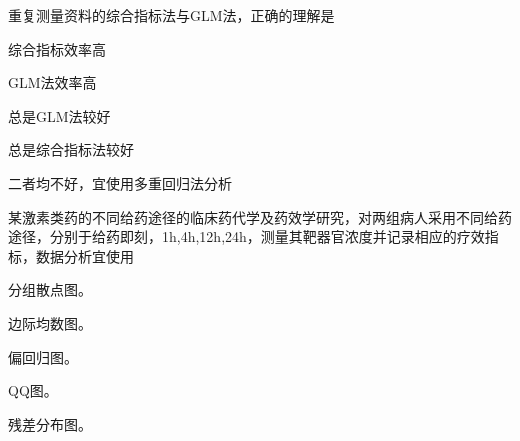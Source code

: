 \par\addvspace{6pt}\noindent\begin{minipage}{\linewidth}


重复测量资料的综合指标法与GLM法，正确的理解是


\begin{choices}

\item 综合指标效率高

\item GLM法效率高

\item 总是GLM法较好

\item 总是综合指标法较好

\item 二者均不好，宜使用多重回归法分析

\end{choices}

\end{minipage}\par\vspace{4pt}

\par\addvspace{6pt}\noindent\begin{minipage}{\linewidth}


某激素类药的不同给药途径的临床药代学及药效学研究，对两组病人采用不同给药途径，分别于给药即刻，1h,4h,12h,24h，测量其靶器官浓度并记录相应的疗效指标，数据分析宜使用


\begin{choices}

\item 分组散点图。

\item 边际均数图。

\item 偏回归图。

\item QQ图。

\item 残差分布图。

\end{choices}

\end{minipage}\par\vspace{4pt}

